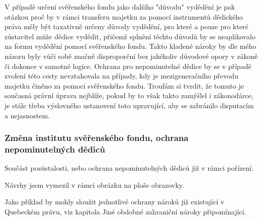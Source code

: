 \documentclass{article}
\begin{document}
V případě určení svěřenského fondu jako dalšího "důvodu" vydědění je pak otázkou proč by v rámci transferu majetku za pomocí instrumentů dědického práva měly být taxativně určeny důvody vydědění, pro které a pouze pro které zůstavitel může dědice vydědit, přičemž splnění těchto důvodů by se neaplikovalo na formu vydědění pomocí svěřenského fondu. Takto kladené nároky by dle mého názoru byly vůči sobě značně disproporční bez jakékoliv důvodové opory v zákoně či dokonce v samotné logice. Ochrana pro nepominutelné dědice by se v případě zvolení této cesty nevztahovala na případy, kdy je mezigeneračního převodu majetku činěno za pomoci svěřenského fondu. Troufám si tvrdit, že tomuto je současná právní úprava nejblíže, pokud by to však takto zamýšlel i zákonodárce, je stále třeba výslovného ustanovení toto upravující, aby se zabránilo disputacím a nejasnostem.\\



\subsubsection{Změna institutu svěřenského fondu, ochrana nepominutelných dědiců}

Součást pozůstalosti, nebo ochrana nepominutelných dědiců již v rámci pořízení.

Návrhy jsem vymezil v rámci obrázku na ploše obrazovky.


Jako příklad by mohly sloužit jednotlivé ochrany nároků již existující v Quebeckém právu, viz kapitola Jiné obdobné zahraniční nároky připomínající.
\end{document}
